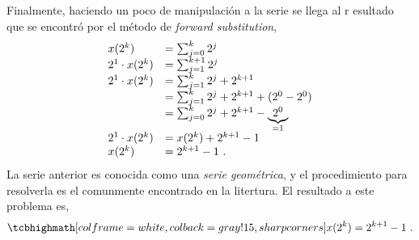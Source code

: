 \begin{enumerate}[label=\textbf{\alph*.}]
\begin{solution}
\begin{equation*}
        \end{equation*}
        Finalmente, haciendo un poco de manipulación a la serie se llega al r esultado que se encontró por el método de \textit{forward substitution},
        \begin{equation*}
            \begin{array}{l l}
                x(2^k) & = \sum_{j = 0}^{k} 2^j \\
                {2^1} \cdot {x(2^k)} & = \sum_{j = 1}^{k+1} 2^{j} \\
                {2^1} \cdot {x(2^k)} & = \sum_{j = 1}^{k} 2^{j} + 2^{k+1} \\
                & = \sum_{j = 1}^{k} 2^{j} + 2^{k+1} + (2^0 - 2^0) \\
                & = \sum_{j = 0}^{k} 2^{j} + 2^{k+1} - \underbrace{2^0}_{=1} \\
                {2^1} \cdot {x(2^k)} & = x(2^k) + 2^{k+1} - 1 \\
                x(2^k) & = 2^{k+1} - 1\ .
            \end{array}
        \end{equation*}
        La serie anterior es conocida como una \textit{serie geométrica}, y el procedimiento para resolverla es el comunmente encontrado en la litertura. El resultado a este problema es,
        \begin{equation}
            \result{x(2^k) = 2^{k+1} - 1\ .}
        \end{equation}
    \end{solution}


\end{enumerate}
